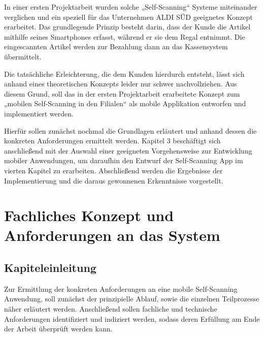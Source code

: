 In einer ersten Projektarbeit wurden solche „Self-Scanning“ Systeme miteinander verglichen und ein speziell für das Unternehmen ALDI SÜD geeignetes Konzept erarbeitet. Das grundlegende Prinzip besteht darin, dass der Kunde die Artikel mithilfe seines Smartphones erfasst, während er sie dem Regal entnimmt. Die eingescannten Artikel werden zur Bezahlung dann an das Kassensystem übermittelt.

Die tatsächliche Erleichterung, die dem Kunden hierdurch entsteht, lässt sich anhand eines theoretischen Konzepts leider nur schwer nachvollziehen. Aus diesem Grund, soll das in der ersten Projektarbeit erarbeitete Konzept zum „mobilen Self-Scanning in den Filialen“ als mobile Applikation entworfen und implementiert werden.

Hierfür sollen zunächst nochmal die Grundlagen erläutert und anhand dessen die konkreten Anforderungen ermittelt werden. Kapitel 3 beschäftigt sich anschließend mit der Auswahl einer geeigneten Vorgehensweise zur Entwicklung mobiler Anwendungen, um daraufhin den Entwurf der Self-Scanning App im vierten Kapitel zu erarbeiten. Abschließend werden die Ergebnisse der Implementierung und die daraus gewonnenen Erkenntnisse vorgestellt.


\chapter{Fachliches Konzept und Anforderungen an das System}\label{kap:konzept}
\section{Kapiteleinleitung}
Zur Ermittlung der konkreten Anforderungen an eine mobile Self-Scanning Anwendung, soll zunächst der prinzipielle Ablauf, sowie die einzelnen Teilprozesse näher erläutert werden. Anschließend sollen fachliche und technische Anforderungen identifiziert und indiziert werden, sodass deren Erfüllung am Ende der Arbeit überprüft werden kann.

